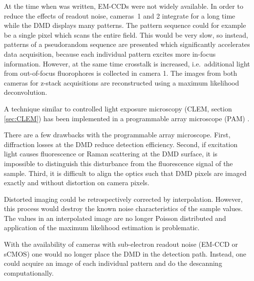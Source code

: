 At the time when \cite{Heintzmann2001a} was written, EM-CCDs were not
widely available. In order to reduce the effects of readout noise,
cameras~1 and 2 integrate for a long time while the DMD displays many
patterns. The pattern sequence could for example be a single pixel
which scans the entire field. This would be very slow, so instead,
patterns of a pseudorandom sequence are presented which significantly
accelerates data acquisition, because each individual pattern excites
more in-focus information. However, at the same time crosstalk is
increased, i.e.\ additional light from out-of-focus fluorophores is
collected in camera 1.  The images from both cameras for z-stack
acquisitions are reconstructed using a maximum likelihood
deconvolution.

A technique similar to controlled light exposure microscopy (CLEM,
section \ref{sec:CLEM}) has been implemented in a programmable array
microscope (PAM) \citep{Caarls2011}. 


There are a few drawbacks with the programmable array microscope.
First, diffraction losses at the DMD reduce detection
efficiency. Second, if excitation light causes fluorescence or Raman
scattering at the DMD surface, it is impossible to distinguish this
disturbance from the fluorescence signal of the sample. Third, it is
difficult to align the optics such that DMD pixels are imaged exactly
and without distortion on camera pixels.

Distorted imaging could be retrospectively corrected by
interpolation. However, this process would destroy the known noise
characteristics of the sample values. The values in an interpolated
image are no longer Poisson distributed and application of the maximum
likelihood estimation is problematic.

With the availability of cameras with sub-electron readout noise
(EM-CCD or sCMOS) one would no longer place the DMD in the detection
path. Instead, one could acquire an image of each individual pattern
and do the descanning computationally.


%
%
%
